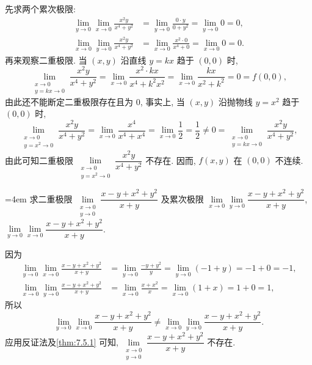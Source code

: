 \begin{solution}
先求两个累次极限:
\begin{align*}
  \lim_{y \to 0} \lim_{x \to 0} \frac{x^{2}y}{x^{4} + y^{2}} &= \lim_{y \to 0} \frac{0 \cdot y}{0 + y^{2}} = \lim_{y \to 0} 0 = 0, \\
  \lim_{x \to 0} \lim_{y \to 0} \frac{x^{2}y}{x^{4} + y^{2}} &= \lim_{x \to 0} \frac{x^{2} \cdot 0}{x^{4} + 0} = \lim_{x \to 0} 0 = 0.
\end{align*}
再来观察二重极限. 当 $(x, y)$ 沿直线 $y = kx$ 趋于 $(0, 0)$ 时,
\[
  \lim_{\substack{x \to 0 \\ y = kx \to 0}} \frac{x^{2}y}{x^{4} + y^{2}} = \lim_{x \to 0} \frac{x^{2} \cdot kx}{x^{4} + k^{2}x^{2}} = \lim_{x \to 0} \frac{kx}{x^{2} + k^{2}} = 0 = f(0, 0),
\]
由此还不能断定二重极限存在且为 $0$, 事实上, 当 $(x, y)$ 沿抛物线 $y = x^{2}$ 趋于 $(0, 0)$ 时,
\[
  \lim_{\substack{x \to 0 \\ y = x^{2} \to 0}} \frac{x^{2}y}{x^{4} + y^{2}} = \lim_{x \to 0} \frac{x^{4}}{x^{4} + x^{4}} = \lim_{x \to 0} \frac{1}{2} = \frac{1}{2} \neq 0 = \lim_{\substack{x \to 0 \\ y = kx \to 0}} \frac{x^{2}y}{x^{4} + y^{2}},
\]
由此可知二重极限 $\lim\limits_{\substack{x \to 0 \\ y = x^{2} \to 0}} \dfrac{x^{2}y}{x^{4} + y^{2}}$ 不存在. 因而, $f(x, y)$ 在 $(0, 0)$ 不连续.\qedhere
\end{solution}

\begin{example}\label{ex:7.5.7}
{\emergencystretch=4em
求二重极限 $\lim\limits_{\substack{x \to 0 \\ y \to 0}} \dfrac{x - y + x^{2} + y^{2}}{x + y}$ 及累次极限 $\lim\limits_{x \to 0} \lim\limits_{y \to 0} \dfrac{x - y + x^{2} + y^{2}}{x + y}$, $\lim\limits_{y \to 0} \lim\limits_{x \to 0} \dfrac{x - y + x^{2} + y^{2}}{x + y}$.\par}
\end{example}

\begin{solution}[解法 1]
因为
\begin{align*}
  \lim_{y \to 0} \lim_{x \to 0} \frac{x - y + x^{2} + y^{2}}{x + y} &= \lim_{y \to 0} \frac{-y + y^{2}}{y} = \lim_{y \to 0} (-1 + y) = -1 + 0 = -1, \\
  \lim_{x \to 0} \lim_{y \to 0} \frac{x - y + x^{2} + y^{2}}{x + y} &= \lim_{x \to 0} \frac{x + x^{2}}{x} = \lim_{x \to 0} (1 + x) = 1 + 0 = 1,
\end{align*}
所以
\[
  \lim_{y \to 0} \lim_{x \to 0} \frac{x - y + x^{2} + y^{2}}{x + y} \neq \lim_{x \to 0} \lim_{y \to 0} \frac{x - y + x^{2} + y^{2}}{x + y}.
\]
应用反证法及\cref{thm:7.5.1} 可知, $\lim\limits_{\substack{x \to 0 \\ y \to 0}} \dfrac{x - y + x^{2} + y^{2}}{x + y}$ 不存在.\noqedhere
\end{solution}

